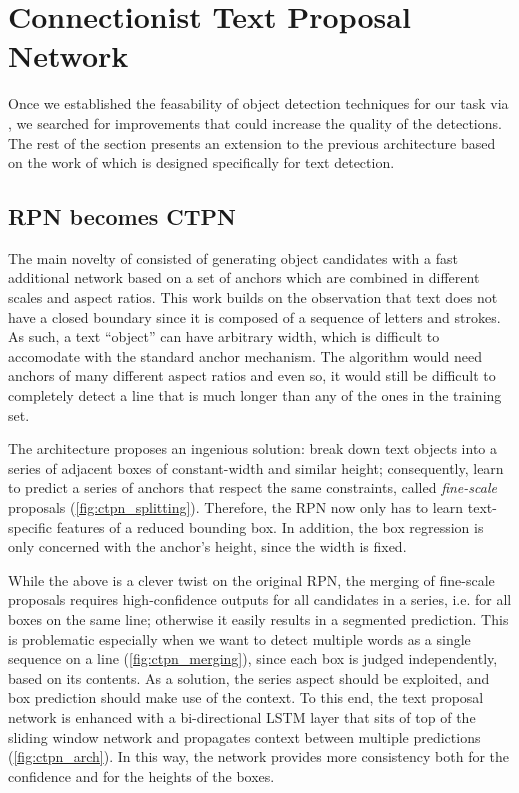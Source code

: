 
\section{Connectionist Text Proposal Network}\label{sec:ctpn}

	Once we established the feasability of object detection techniques for our task via \FRCNN{}, we searched for improvements that could increase the quality of the detections. The rest of the section presents an extension to the previous architecture based on the work of \citet{CRNN} which is designed specifically for text detection.


	\subsection{RPN becomes CTPN}
		The main novelty of \FRCNN{} consisted of generating object candidates with a fast additional network based on a set of anchors which are combined in different scales and aspect ratios. This work builds on the observation that text does not have a closed boundary since it is composed of a sequence of letters and strokes. As such, a text ``object'' can have arbitrary width, which is difficult to accomodate with the standard anchor mechanism. The algorithm would need anchors of many different aspect ratios and even so, it would still be difficult to completely detect a line that is much longer than any of the ones in the training set.

		The \CTPN{} architecture proposes an ingenious solution: break down text objects into a series of adjacent boxes of constant-width and similar height; consequently, learn to predict a series of anchors that respect the same constraints, called \emph{fine-scale} proposals (\autoref{fig:ctpn_splitting}). Therefore, the RPN now only has to learn text-specific features of a reduced bounding box. In addition, the box regression is only concerned with the anchor's height, since the width is fixed.

		While the above is a clever twist on the original RPN, the merging of fine-scale proposals requires high-confidence outputs for all candidates in a series, i.e. for all boxes on the same line; otherwise it easily results in a segmented prediction. This is problematic especially when we want to detect multiple words as a single sequence on a line (\autoref{fig:ctpn_merging}), since each box is judged independently, based on its contents. As a solution, the series aspect should be exploited, and box prediction should make use of the context. To this end, the text proposal network is enhanced with a bi-directional LSTM layer that sits of top of the sliding window network and propagates context between multiple predictions (\autoref{fig:ctpn_arch}). In this way, the network provides more consistency both for the confidence and for the heights of the boxes.

